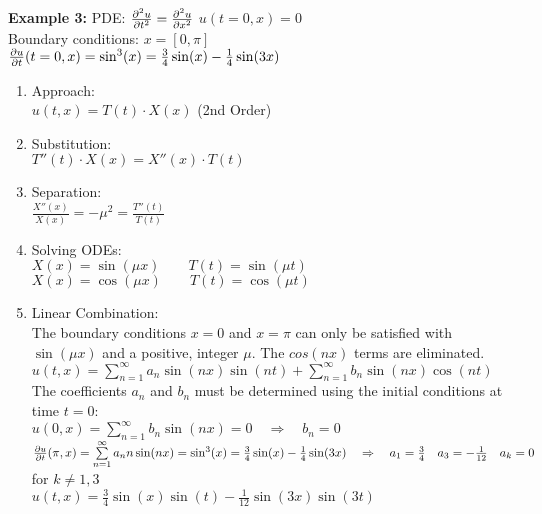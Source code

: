 \hfill
\begin{minipage}[t]{0.49\textwidth}
\textbf{Example 3: }PDE: $\frac{\partial ^2u}{\partial t^2}=\frac{\partial ^2u}{\partial x^2}$ \quad $u(t=0,x)=0$\\
Boundary conditions: $x=[0,\pi]$ \\
\qquad\qquad $\frac{\partial u}{\partial t}(t=0,x)=\sin^3(x)=\frac34\sin(x)-\frac14\sin(3x)$
\begin{enumerate}
	\item Approach:\\[0.4cm]
	$u(t,x)=T(t) \cdot X(x) $ (2nd Order)
	\item Substitution:\\[0.4cm]
	$T''(t)\cdot X(x) = X''(x)\cdot T(t)$
	\item Separation:\\[0.4cm]
	$\frac{X''(x)}{X(x)}= -\mu^2=\frac{T''(t)}{T(t)}$
	\item Solving ODEs:\\[0.4cm]
		$X(x)=\sin(\mu x) \qquad T(t)=\sin(\mu t)$\\
		$X(x)=\cos(\mu x) \qquad T(t)=\cos(\mu t)$
	\item Linear Combination:\\[0.4cm]
		The boundary conditions $x=0$ and $x=\pi$ can only be satisfied with $\sin(\mu x) $ and a positive, integer $\mu$. The $cos(nx)$ terms are eliminated.\\[0.4cm]
		$u(t,x)=\sum\limits_{n=1}^{\infty}{a_n\sin(nx)\sin(nt)} + \sum\limits_{n=1}^{\infty}{b_n\sin(nx)\cos(nt)}$\\[0.4cm]
		The coefficients $a_n$ and $b_n$ must be determined using the initial conditions at time $t=0$:\\[0.4cm]
		$u(0,x)=\sum\limits_{n=1}^{\infty}{b_n\sin(nx)}=0 \quad\Rightarrow\quad b_n=0$\\[0.2cm]
		$\frac{\partial u}{\partial t}(\pi,x)=\sum\limits_{n=1}^{\infty}{a_nn\sin(nx)}=\sin^3(x)=\frac34\sin(x)-\frac14\sin(3x) \quad\Rightarrow\quad a_1=\frac34 \quad a_3=-\frac{1}{12}\quad a_k=0$ for $k\neq 1,3$\\[0.4cm]
		$u(t,x)=\frac34\sin(x)\sin(t)-\frac1{12}\sin(3x)\sin(3t)$
\end{enumerate}
\end{minipage}
